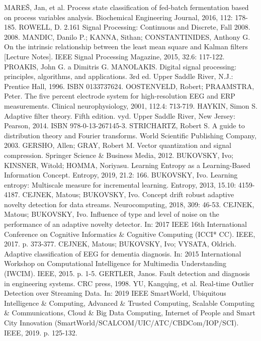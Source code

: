 \documentclass[11pt,twoside,openright]{report}
\begin{document}
\begin{thebibliography}{L}
MAREŠ, Jan, et al. Process state classification of fed-batch fermentation based on process variables analysis. Biochemical Engineering Journal, 2016, 112: 178-185.
ROWELL, D. 2.161 Signal Processing: Continuous and Discrete, Fall 2008. 2008.
MANDIC, Danilo P.; KANNA, Sithan; CONSTANTINIDES, Anthony G. On the intrinsic relationship between the least mean square and Kalman filters [Lecture Notes]. IEEE Signal Processing Magazine, 2015, 32.6: 117-122.
PROAKIS, John G. a Dimitris G. MANOLAKIS. Digital signal processing: principles, algorithms, and applications. 3rd ed. Upper Saddle River, N.J.: Prentice Hall, 1996. ISBN 0133737624.
OOSTENVELD, Robert; PRAAMSTRA, Peter. The five percent electrode system for high-resolution EEG and ERP measurements. Clinical neurophysiology, 2001, 112.4: 713-719.
HAYKIN, Simon S. Adaptive filter theory. Fifth edition. vyd. Upper Saddle River, New Jersey: Pearson, 2014. ISBN 978-0-13-267145-3.
STRICHARTZ, Robert S. A guide to distribution theory and Fourier transforms. World Scientific Publishing Company, 2003.
GERSHO, Allen; GRAY, Robert M. Vector quantization and signal compression. Springer Science \& Business Media, 2012.
BUKOVSKY, Ivo; KINSNER, Witold; HOMMA, Noriyasu. Learning Entropy as a Learning-Based Information Concept. Entropy, 2019, 21.2: 166.
BUKOVSKY, Ivo. Learning entropy: Multiscale measure for incremental learning. Entropy, 2013, 15.10: 4159-4187.
CEJNEK, Matous; BUKOVSKY, Ivo. Concept drift robust adaptive novelty detection for data streams. Neurocomputing, 2018, 309: 46-53.
 CEJNEK, Matous; BUKOVSKY, Ivo. Influence of type and level of noise on the performance of an adaptive novelty detector. In: 2017 IEEE 16th International Conference on Cognitive Informatics \& Cognitive Computing (ICCI* CC). IEEE, 2017. p. 373-377.
CEJNEK, Matous; BUKOVSKY, Ivo; VYSATA, Oldrich. Adaptive classification of EEG for dementia diagnosis. In: 2015 International Workshop on Computational Intelligence for Multimedia Understanding (IWCIM). IEEE, 2015. p. 1-5.
GERTLER, Janos. Fault detection and diagnosis in engineering systems. CRC press, 1998.
YU, Kangqing, et al. Real-time Outlier Detection over Streaming Data. In: 2019 IEEE SmartWorld, Ubiquitous Intelligence \& Computing, Advanced \& Trusted Computing, Scalable Computing \& Communications, Cloud \& Big Data Computing, Internet of People and Smart City Innovation (SmartWorld/SCALCOM/UIC/ATC/CBDCom/IOP/SCI). IEEE, 2019. p. 125-132.

\end{thebibliography}
\end{document}
